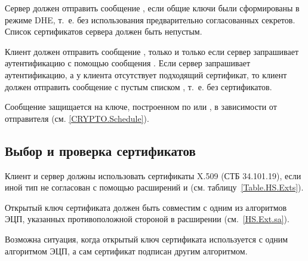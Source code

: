 
Сервер должен отправить сообщение , если 
общие ключи были сформированы в режиме DHE, т.~е. без использования 
предварительно согласованных секретов.
%
Список сертификатов сервера должен быть непустым.

Клиент должен отправить сообщение , только и только если
сервер запрашивает аутентификацию с помощью сообщения 
.
%
Если сервер запрашивает аутентификацию, а у клиента отсутствует подходящий 
сертификат, то клиент должен отправить сообщение  
с пустым списком , т.~е. без сертификатов.


Сообщение  защищается на ключе, построенном по 
 или , 
в зависимости от отправителя (см. \ref{CRYPTO.Schedule}).

\subsection{Выбор и проверка сертификатов}\label{HS.Auth.Cert} 

Клиент и сервер должны использовать сертификаты X.509 (СТБ 34.101.19), если 
иной тип не согласован с помощью расширений 
и  
(см. таблицу~\ref{Table.HS.Exts}).

Открытый ключ сертификата должен быть совместим с одним из алгоритмов ЭЦП, 
указанных противоположной стороной в расширении 
(см.~\ref{HS.Ext.sa}).

\begin{note*}
Возможна ситуация, когда открытый ключ сертификата используется с одним 
алгоритмом ЭЦП, а сам сертификат подписан другим алгоритмом.
\end{note*}

